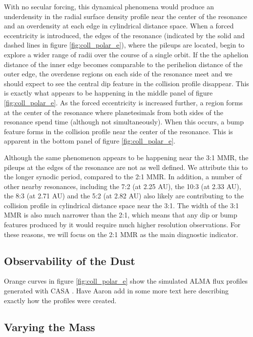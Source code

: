 \documentclass[onecolumn]{aastex63}
\begin{document}
With no secular forcing, this dynamical phenomena would produce an underdensity in the radial surface density profile near the center of the resonance and an overdensity at each edge in cylindrical distance space. When a forced eccentricity is introduced, the edges of the resonance (indicated by the solid and dashed lines in figure \ref{fig:coll_polar_e}), where the pileups are located, begin to explore a wider range of radii over the course of a single orbit. If the the aphelion distance of the inner edge becomes comparable to the perihelion distance of the outer edge, the overdense regions on each side of the resonance meet and we should expect to see the central dip feature in the collision profile disappear. This is exactly what appears to be happening in the middle panel of figure \ref{fig:coll_polar_e}. As the forced eccentricity is increased further, a region forms at the center of the resonance where planetesimals from both sides of the resonance spend time (although not simultaneously). When this occurs, a bump feature forms in the collision profile near the center of the resonance. This is apparent in the bottom panel of figure \ref{fig:coll_polar_e}.

Although the same phenomenon appears to be happening near the 3:1 MMR, the pileups at the edges of the resonance are not as well defined. We attribute this to the longer synodic period, compared to the 2:1 MMR. In addition, a number of other nearby resonances, including the 7:2 (at 2.25 AU), the 10:3 (at 2.33 AU), the 8:3 (at 2.71 AU) and the 5:2 (at 2.82 AU) also likely are contributing to the collision profile in cylindrical distance space near the 3:1. The width of the 3:1 MMR is also much narrower than the 2:1, which means that any dip or bump features produced by it would require much higher resolution observations. For these reasons, we will focus on the 2:1 MMR as the main diagnostic indicator.

\subsection{Observability of the Dust}

Orange curves in figure \ref{fig:coll_polar_e} show the simulated ALMA flux profiles generated with {\sc CASA} \citep{2007ASPC..376..127M}. Have Aaron add in some more text here describing exactly how the profiles were created.

\subsection{Varying the Mass}
\end{document}
